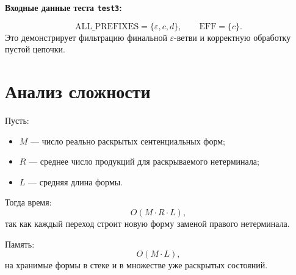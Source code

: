 \documentclass[12pt,a4paper]{article}
\begin{document}
\textbf{Входные данные теста \texttt{test3}:}

{\small
{}
}

\[
\mathrm{ALL\_PREFIXES} = \{\varepsilon, c, d\},\qquad
\mathrm{EFF} = \{c\}.
\]
Это демонстрирует фильтрацию финальной $\varepsilon$-ветви и корректную обработку пустой цепочки.

\section{Анализ сложности}
Пусть:
\begin{itemize}
    \item $M$ --- число реально раскрытых сентенциальных форм;
    \item $R$ --- среднее число продукций для раскрываемого нетерминала;
    \item $L$ --- средняя длина формы.
\end{itemize}

Тогда время:
\[
O(M \cdot R \cdot L),
\]
так как каждый переход строит новую форму заменой правого нетерминала.

Память:
\[
O(M \cdot L),
\]
на хранимые формы в стеке и в множестве уже раскрытых состояний.
\end{document}
